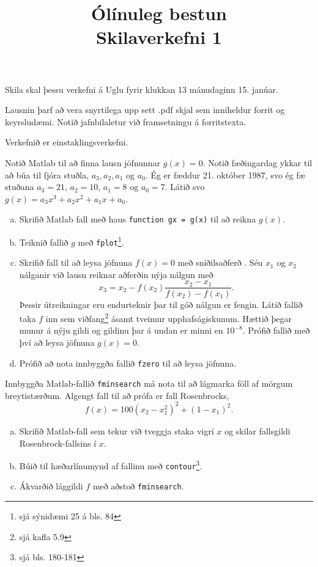 \documentclass{article}
\title{Ólínuleg bestun \\ Skilaverkefni 1}
\author{}
\begin{document}
\maketitle

Skila skal þessu verkefni á Uglu fyrir klukkan 13 mánudaginn 15. janúar.

Lausnin þarf að vera snyrtilega upp sett .pdf skjal sem inniheldur forrit og keyrsludæmi. Notið jafnbilaletur við framsetningu á forritstexta.

Verkefnið er einstaklingsverkefni.

\question

Notið Matlab til að finna lausn jöfnunnar $g(x) = 0$. Notið fæðingardag ykkar til að búa til fjóra stuðla, $a_3, a_2, a_1$ og $a_0$. Ég er fæddur 21. október 1987, svo ég fæ stuðana $a_3 = 21$, $a_2 = 10$, $a_1 = 8$ og $a_0 = 7$. Látið svo $g(x) = a_3x^3 + a_2x^2 + a_1x + a_0$.

\begin{enumerate}[a)]
    \item Skrifið Matlab fall með haus \texttt{function gx = g(x)} til að reikna $g(x)$.
    \item Teiknið fallið $g$ með \texttt{fplot}\footnote{sjá sýnidæmi 25 á bls. 84}.
    \item Skrifið fall til að leysa jöfnuna $f(x) = 0$ með sniðilsaðferð . Séu $x_1$ og $x_2$ nálganir við lausn reiknar aðferðin nýja nálgun með
    \[
        x_3 = x_2 - f(x_2)\frac{x_2-x_1}{f(x_2) - f(x_1)}.
    \]
    Þessir útreikningar eru endurteknir þar til góð nálgun er fengin.
    Látið fallið taka $f$ inn sem viðfang\footnote{sjá kafla 5.9} ásamt tveimur upphafságiskunum. Hættið þegar munur á nýju gildi og gildinu þar á undan er minni en $10^{-8}$. Prófið fallið með því að leysa jöfnuna $g(x) = 0$.
    \item Prófið að nota innbyggða fallið \texttt{fzero} til að leysa jöfnuna.
\end{enumerate}

\question 

Innbyggða Matlab-fallið \texttt{fminsearch} má nota til að lágmarka föll af mörgum breytistærðum. Algengt fall til að prófa er fall Rosenbrocks,
\[
    f(x)  = 100(x_2 - x_1^2)^2 + (1-x_1)^2.
\]

\begin{enumerate}[a)]
    \item Skrifið Matlab-fall sem tekur við tveggja staka vigri $x$ og skilar fallsgildi Rosenbrock-fallsins í $x$.
    \item Búið til hæðarlínumynd af fallinu með \texttt{contour}\footnote{sjá bls. 180-181}.
    \item Ákvarðið lággildi $f$ með aðstoð \texttt{fminsearch}.
\end{enumerate}
\end{document}
